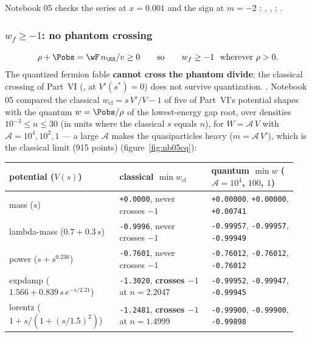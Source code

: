 Notebook 05 checks the series at $x=0.001$ and the sign at $m=-2$ :
, ,
; .

\subsubsection{\texorpdfstring{$w_f\geq-1$}{w\_f >= -1}: no phantom crossing}
\label{sec:4.5.9}

\[
  \rho+\Pobs=\wF\,n_{\KS}/v\geq0\qquad\text{so}\qquad w_f\geq-1\ \text{ wherever } \rho>0 .
\]
The quantized fermion fable \textbf{cannot cross the phantom divide}; the classical crossing of Part~VI
(, at $V'(s^*)=0$) does not survive quantization. 
. Notebook 05 compared the classical $w_{\mathrm{cl}}=s\,V'/V-1$ of five of
Part~VI's potential shapes with the quantum $w=\Pobs/\rho$ of the lowest-energy gap root, over densities
$10^{-3}\leq n\leq30$ (in units where the classical $s$ equals $n$), for $W=\mathcal A\,V$ with
$\mathcal A=10^4,10^2,1$ --- a large $\mathcal A$ makes the quasiparticles heavy ($m=\mathcal A\,V'$), which
is the classical limit (915 points) 
(figure~\ref{fig:nb05cq}):
\begin{center}
\small
\renewcommand{\arraystretch}{1.3}
\begin{tabular}{@{}>{\raggedright\arraybackslash}p{0.36\linewidth}>{\raggedright\arraybackslash}p{0.3\linewidth}>{\raggedright\arraybackslash}p{0.28\linewidth}@{}}
\toprule
potential ($V(s)$) & classical $\min w_{\mathrm{cl}}$ & quantum $\min w$ ($\mathcal A=10^4$, $100$, $1$)\\
\midrule
mass ($s$) & \texttt{+0.0000}, never crosses $-1$ & \texttt{+0.00000}, \texttt{+0.00000}, \texttt{+0.00741}\\
lambda-mass ($0.7+0.3\,s$) & \texttt{-0.9996}, never crosses $-1$ & \texttt{-0.99957}, \texttt{-0.99957}, \texttt{-0.99949}\\
power ($s+s^{0.236}$) & \texttt{-0.7601}, never crosses $-1$ & \texttt{-0.76012}, \texttt{-0.76012}, \texttt{-0.76012}\\
expdamp ($1.566+0.839\,s\,e^{-s/2.21}$) & \texttt{-1.3020}, \textbf{crosses $-1$} at $n=2.2047$ & \texttt{-0.99952}, \texttt{-0.99947}, \texttt{-0.99945}\\
lorentz ($1+s/(1+(s/1.5)^2)$) & \texttt{-1.2481}, \textbf{crosses $-1$} at $n=1.4999$ & \texttt{-0.99900}, \texttt{-0.99900}, \texttt{-0.99898}\\
\bottomrule
\end{tabular}
\end{center}
